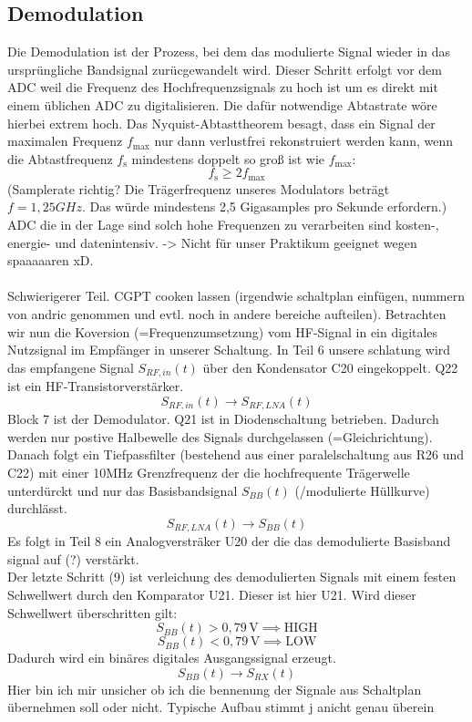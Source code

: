\subsection{Demodulation}
Die Demodulation ist der Prozess, bei dem das modulierte Signal wieder in das ursprüngliche Bandsignal zurücgewandelt wird. Dieser Schritt erfolgt
vor dem ADC weil die Frequenz des Hochfrequenzsignals zu hoch ist um es direkt mit einem üblichen ADC zu digitalisieren. Die dafür notwendige
Abtastrate wöre hierbei extrem hoch.
Das Nyquist-Abtasttheorem besagt, dass ein Signal der maximalen Frequenz $f_\mathrm{max}$ nur dann verlustfrei rekonstruiert werden kann,
wenn die Abtastfrequenz $f_\mathrm{s}$ mindestens doppelt so groß ist wie $f_\mathrm{max}$:
\begin{equation}
    f_\mathrm{s} \geq 2 f_\mathrm{max}
\end{equation}
(Samplerate richtig? Die Trägerfrequenz unseres
Modulators beträgt $f=1,25GHz$. Das würde mindestens 2,5 Gigasamples pro Sekunde erfordern.) ADC die in der Lage sind solch hohe Frequenzen
zu verarbeiten sind kosten-, energie- und datenintensiv. -> Nicht für unser Praktikum geeignet wegen spaaaaaren xD.\\
\\
Schwierigerer Teil. CGPT cooken lassen (irgendwie schaltplan einfügen, nummern von andric genommen und evtl. noch in andere bereiche aufteilen). 
Betrachten wir nun die Koversion (=Frequenzumsetzung) vom HF-Signal in ein digitales Nutzsignal im Empfänger in unserer Schaltung. In Teil 6
unsere schlatung wird das empfangene Signal $S_{RF,in}(t)$ über den Kondensator C20 eingekoppelt. Q22 ist ein HF-Transistorverstärker.\\
\[
S_{RF,in}(t) \rightarrow S_{RF,LNA}(t)
\]
Block 7 ist der Demodulator. Q21 ist in Diodenschaltung betrieben. Dadurch werden nur postive Halbewelle des Signals durchgelassen (=Gleichrichtung).
Danach folgt ein Tiefpassfilter (bestehend aus einer paralelschaltung aus R26 und C22) mit einer 10MHz Grenzfrequenz der die hochfrequente Trägerwelle unterdürckt und nur das Basisbandsignal $S_{BB}(t)$
(/modulierte Hüllkurve) durchlässt.
\[
S_{RF,LNA}(t) \rightarrow S_{BB}(t)
\]
Es folgt in Teil 8 ein Analogversträker U20 der die das demodulierte Basisband signal auf (?) verstärkt.\\
Der letzte Schritt (9) ist verleichung des demodulierten Signals mit einem festen Schwellwert durch den Komparator U21. Dieser ist hier U21.
Wird dieser Schwellwert überschritten gilt:
\[
S_{BB}(t) > 0{,}79\,\mathrm{V} \implies \text{HIGH}
\]
\[
S_{BB}(t) < 0{,}79\,\mathrm{V} \implies \text{LOW}
\]
Dadurch wird ein binäres digitales Ausgangssignal erzeugt.
\[
S_{BB}(t) \rightarrow S_{RX}(t)
\]
Hier bin ich mir unsicher ob ich die bennenung der Signale aus Schaltplan übernehmen soll oder nicht. Typische Aufbau stimmt j anicht genau überein

